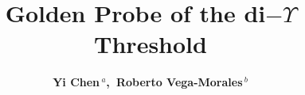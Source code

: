 \documentclass[nofootinbib,twocolumn,prl,preprintnumbers]{revtex4-1}
\begin{document}
\def\lsim{\mathrel{\rlap{\lower4pt\hbox{\hskip1pt$\sim$}}
  \raise1pt\hbox{$<$}}}
\def\gsim{\mathrel{\rlap{\lower4pt\hbox{\hskip1pt$\sim$}}
  \raise1pt\hbox{$>$}}}
\newcommand{\vev}[1]{ \left\langle {#1} \right\rangle }
\newcommand{\bra}[1]{ \langle {#1} | }
\newcommand{\ket}[1]{ | {#1} \rangle }
\newcommand{\ev}{ {\rm eV} }
\newcommand{\kev}{{\rm keV}}
\newcommand{\mev}{{\rm MeV}}
\newcommand{\tev}{{\rm TeV}}
\newcommand{\mpl}{$M_{Pl}$}
\newcommand{\mw}{$M_{W}$}
\newcommand{\Ft}{F_{T}}
\newcommand{\Zparity}{\mathbb{Z}_2}
\newcommand{\BLambda}{\boldsymbol{\lambda}}
\newcommand{\met}{\;\not\!\!\!{E}_T}
\newcommand{\beq}{\begin{equation}}
\newcommand{\eeq}{\end{equation}}
\newcommand{\bea}{\begin{eqnarray}}
\newcommand{\eea}{\end{eqnarray}}
\newcommand{\nn}{\nonumber}
\newcommand{\gev}{{\mathrm GeV}}
\newcommand{\hc}{\mathrm{h.c.}}
\newcommand{\eps}{\epsilon}
\newcommand{\bwt}{\begin{widetext}}
\newcommand{\ewt}{\end{widetext}}
\newcommand{\draftnote}[1]{{\bf\color{blue} #1}}

\newcommand{\cO}{{\cal O}}
\newcommand{\cL}{{\cal L}}
\newcommand{\cM}{{\cal M}}

\newcommand{\fref}[1]{Fig.~\ref{fig:#1}} 
\newcommand{\eref}[1]{Eq.~\eqref{eq:#1}} 
\newcommand{\aref}[1]{Appendix~\ref{app:#1}}
\newcommand{\sref}[1]{Section~\ref{sec:#1}}
\newcommand{\tref}[1]{Table~\ref{tab:#1}}


\title{\Large{{\bf Golden Probe of the di$-\Upsilon$ Threshold}}}

\author{{\bf {Yi Chen$\,^{a}$,~Roberto Vega-Morales$\,^{b}$
}}}
\end{document}
